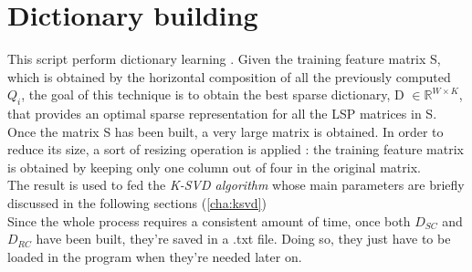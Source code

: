 \section{Dictionary building}
This script perform dictionary learning \cite{omp}. Given the training feature matrix S, which is obtained by the horizontal composition of all the previously computed $Q_i$, the goal of this technique is to obtain the best sparse dictionary, D $\in \mathbb{R}^{W \times K}$, that provides an optimal sparse representation for all the LSP matrices in S.\\
Once the matrix S has been built, a very large matrix is obtained. In order to reduce its size, a sort of resizing operation is applied : the training feature matrix is obtained by keeping only one column out of four in the original matrix.\\
The result is used to fed the \textit{K-SVD algorithm} whose main parameters are briefly discussed in the following sections (\ref{cha:ksvd}) \\
Since the whole process requires a consistent amount of time, once both $D_{SC}$ and $D_{RC}$ have been built, they're saved in a .txt file. Doing so, they just have to be loaded in the program when they're needed later on.


